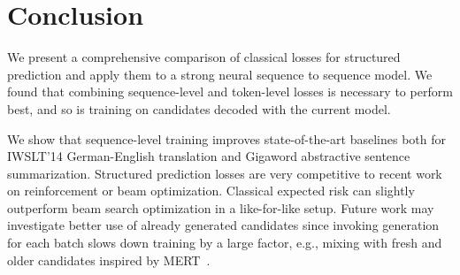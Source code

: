 \documentclass[11pt,a4paper]{article}
\begin{document}
\section{Conclusion}

We present a comprehensive comparison of classical losses for structured prediction and apply them to a strong neural sequence to sequence model.
We found that combining sequence-level and token-level losses is necessary to perform best, and so is training on candidates decoded with the current model.

We show that sequence-level training improves state-of-the-art baselines both for IWSLT'14 German-English translation and Gigaword abstractive sentence summarization. Structured prediction losses are very competitive to recent work on reinforcement or beam optimization. 
Classical expected risk can slightly outperform beam search optimization \citep{wiseman2016acl} in a like-for-like setup.
Future work may investigate better use of already generated candidates since invoking generation for each batch slows down training by a large factor, e.g., mixing with fresh and older candidates inspired by MERT~\cite{och:2003:acl}.



\end{document}
